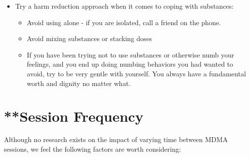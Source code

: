 \documentclass[12pt,letterpaper]{book}
\begin{document}
\begin{itemize}
    \item Try a harm reduction approach when it comes to coping with substances:
    \begin{itemize}
        \item Avoid using alone - if you are isolated, call a friend on the phone.
        \item Avoid mixing substances or stacking doses
        \item If you have been trying not to use substances or otherwise numb your feelings, and you end up doing numbing behaviors you had wanted to avoid, try to be very gentle with yourself. You always have a fundamental worth and dignity no matter what.
    \end{itemize}
\end{itemize}
\section{**Session Frequency}
Although no research exists on the impact of varying time between MDMA sessions, we feel the following factors are worth considering:
\end{document}

